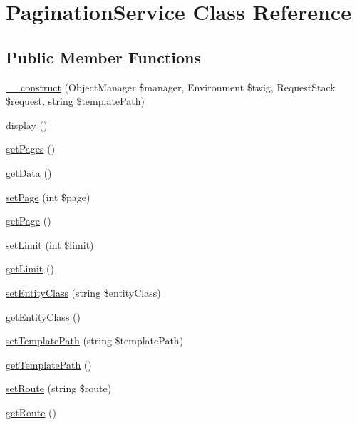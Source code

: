 \hypertarget{class_app_1_1_service_1_1_pagination_service}{}\section{Pagination\+Service Class Reference}
\label{class_app_1_1_service_1_1_pagination_service}
\subsection*{Public Member Functions}
\begin{DoxyCompactItemize}
\item 
\mbox{\hyperlink{class_app_1_1_service_1_1_pagination_service_acbfb54ef94a6d7490713abfa9506cdb5}{\+\_\+\+\_\+construct}} (Object\+Manager \$manager, Environment \$twig, Request\+Stack \$request, string \$template\+Path)
\item 
\mbox{\hyperlink{class_app_1_1_service_1_1_pagination_service_a0b9b6e6acd4a839fc7c2f26f96b5cfa8}{display}} ()
\item 
\mbox{\hyperlink{class_app_1_1_service_1_1_pagination_service_a9613a9ee3ec2d3c253b6cacde84fb992}{get\+Pages}} ()
\item 
\mbox{\hyperlink{class_app_1_1_service_1_1_pagination_service_a81a67162a6288d78fc4c55283325f0b4}{get\+Data}} ()
\item 
\mbox{\hyperlink{class_app_1_1_service_1_1_pagination_service_aa78aeb4cac1dc48ba37c566da928e3a0}{set\+Page}} (int \$page)
\item 
\mbox{\hyperlink{class_app_1_1_service_1_1_pagination_service_a12a549e25239c9219e66322cf6a1be68}{get\+Page}} ()
\item 
\mbox{\hyperlink{class_app_1_1_service_1_1_pagination_service_a50eb9e1116dd170465b21c7664ae17ec}{set\+Limit}} (int \$limit)
\item 
\mbox{\hyperlink{class_app_1_1_service_1_1_pagination_service_adc86593a522f6adc4e47b02b97a6f8d0}{get\+Limit}} ()
\item 
\mbox{\hyperlink{class_app_1_1_service_1_1_pagination_service_a52860badb20cab10adff381d94c20b97}{set\+Entity\+Class}} (string \$entity\+Class)
\item 
\mbox{\hyperlink{class_app_1_1_service_1_1_pagination_service_a82bf7d9129d40bb5d953f2b08210fccc}{get\+Entity\+Class}} ()
\item 
\mbox{\hyperlink{class_app_1_1_service_1_1_pagination_service_a9604a19249a87f4ff96ae3dde0d909e0}{set\+Template\+Path}} (string \$template\+Path)
\item 
\mbox{\hyperlink{class_app_1_1_service_1_1_pagination_service_a4faced39e5a4a69805a7d3121b191ad1}{get\+Template\+Path}} ()
\item 
\mbox{\hyperlink{class_app_1_1_service_1_1_pagination_service_adc73c91e5002b38702ea81bd294e71a6}{set\+Route}} (string \$route)
\item 
\mbox{\hyperlink{class_app_1_1_service_1_1_pagination_service_ac01e8ae14a990fb74fc2e8b0fc1bdb63}{get\+Route}} ()
\end{DoxyCompactItemize}


